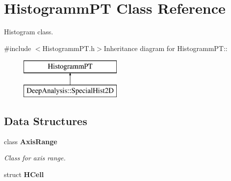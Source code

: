 \section{HistogrammPT Class Reference}
\label{classHistogrammPT}


Histogram class.  


{\ttfamily \#include $<$HistogrammPT.h$>$}Inheritance diagram for HistogrammPT::\begin{figure}[H]
\begin{center}
\leavevmode
\includegraphics[height=2cm]{classHistogrammPT}
\end{center}
\end{figure}
\subsection*{Data Structures}
\begin{DoxyCompactItemize}
\item 
class {\bf AxisRange}
\begin{DoxyCompactList}\small\item\em Class for axis range. \item\end{DoxyCompactList}\item 
struct {\bf HCell}
\end{DoxyCompactItemize}
